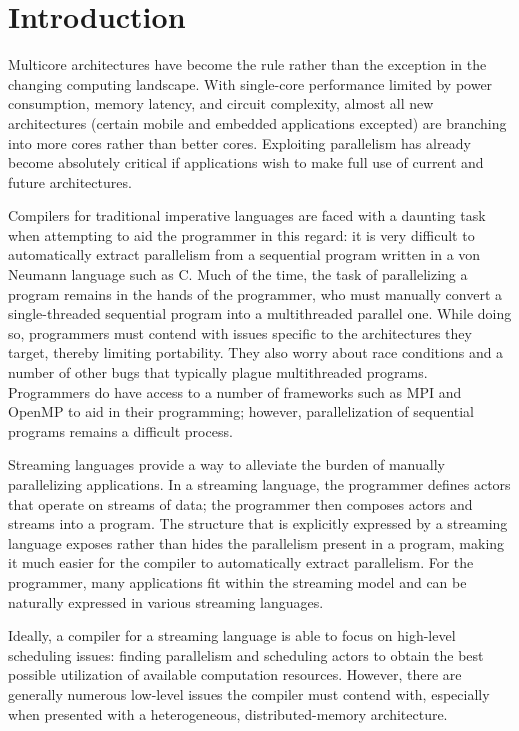 \section{Introduction}

Multicore architectures have become the rule rather than the exception
in the changing computing landscape. With single-core performance
limited by power consumption, memory latency, and circuit complexity,
almost all new architectures (certain mobile and embedded applications
excepted) are branching into more cores rather than better
cores. Exploiting parallelism has already become absolutely critical
if applications wish to make full use of current and future
architectures.

Compilers for traditional imperative languages are faced with a
daunting task when attempting to aid the programmer in this regard: it
is very difficult to automatically extract parallelism from a
sequential program written in a von Neumann language such as C. Much
of the time, the task of parallelizing a program remains in the hands
of the programmer, who must manually convert a single-threaded
sequential program into a multithreaded parallel one. While doing so,
programmers must contend with issues specific to the architectures
they target, thereby limiting portability. They also worry about race
conditions and a number of other bugs that typically plague
multithreaded programs. Programmers do have access to a number of
frameworks such as MPI and OpenMP to aid in their programming;
however, parallelization of sequential programs remains a difficult
process.

Streaming languages provide a way to alleviate the burden of manually
parallelizing applications. In a streaming language, the programmer
defines actors that operate on streams of data; the programmer then
composes actors and streams into a program. The structure that is
explicitly expressed by a streaming language exposes rather than hides
the parallelism present in a program, making it much easier for the
compiler to automatically extract parallelism. For the programmer,
many applications fit within the streaming model and can be naturally
expressed in various streaming languages.

Ideally, a compiler for a streaming language is able to focus on
high-level scheduling issues: finding parallelism and scheduling
actors to obtain the best possible utilization of available
computation resources. However, there are generally numerous low-level
issues the compiler must contend with, especially when presented with
a heterogeneous, distributed-memory architecture.


